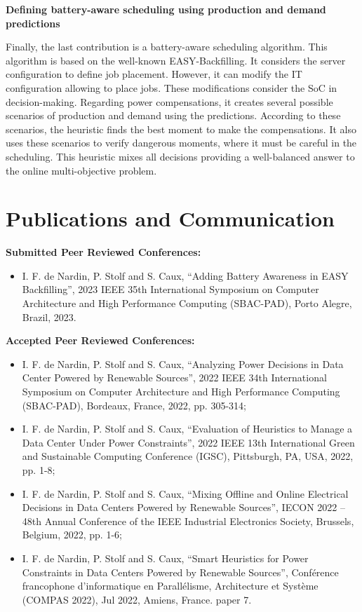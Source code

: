 \begin{center}
    \textbf{Defining battery-aware scheduling using production and demand predictions}
\end{center}

Finally, the last contribution is a battery-aware scheduling algorithm. This algorithm is based on the well-known EASY-Backfilling. It considers the server configuration to define job placement. However, it can modify the IT configuration allowing to place jobs. These modifications consider the SoC in decision-making. Regarding power compensations, it creates several possible scenarios of production and demand using the predictions. According to these scenarios, the heuristic finds the best moment to make the compensations. It also uses these scenarios to verify dangerous moments, where it must be careful in the scheduling. This heuristic mixes all decisions providing a well-balanced answer to the online multi-objective problem.

\section{Publications and Communication}

\textbf{Submitted Peer Reviewed Conferences:}
\begin{itemize}
    \item I. F. de Nardin, P. Stolf and S. Caux, ``Adding Battery Awareness in EASY Backfilling'', 2023 IEEE 35th International Symposium on Computer Architecture and High Performance Computing (SBAC-PAD), Porto Alegre, Brazil, 2023.
\end{itemize}

\textbf{Accepted Peer Reviewed Conferences:}
\begin{itemize}
    \item I. F. de Nardin, P. Stolf and S. Caux, ``Analyzing Power Decisions in Data Center Powered by Renewable Sources'', 2022 IEEE 34th International Symposium on Computer Architecture and High Performance Computing (SBAC-PAD), Bordeaux, France, 2022, pp. 305-314;
    \item I. F. de Nardin, P. Stolf and S. Caux, ``Evaluation of Heuristics to Manage a Data Center Under Power Constraints'', 2022 IEEE 13th International Green and Sustainable Computing Conference (IGSC), Pittsburgh, PA, USA, 2022, pp. 1-8;
    \item I. F. de Nardin, P. Stolf and S. Caux, ``Mixing Offline and Online Electrical Decisions in Data Centers Powered by Renewable Sources'', IECON 2022 – 48th Annual Conference of the IEEE Industrial Electronics Society, Brussels, Belgium, 2022, pp. 1-6;
    \item  I. F. de Nardin, P. Stolf and S. Caux, ``Smart Heuristics for Power Constraints in Data Centers Powered by Renewable Sources'', Conférence francophone d'informatique en Parallélisme, Architecture et Système (COMPAS 2022), Jul 2022, Amiens, France. paper 7.
\end{itemize}

